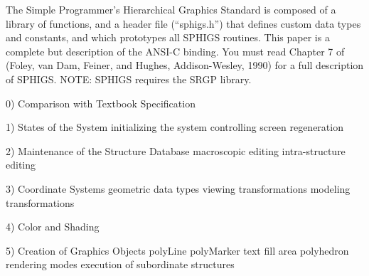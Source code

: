\def\minorsect#1#2{\section{\ttit{#1~~~~}#2}}
\def\majorsect#1#2{\section{\ttit{#1~~~~}#2}}
\def\elementgenerator{~~$\ddagger$}
\newpar
The Simple Programmer's Hierarchical Graphics 
Standard is composed of a library
of functions, and a
header file (``sphigs.h'') that defines custom data types and constants, and
which prototypes all SPHIGS routines.  This paper is a complete but
 description 
of the ANSI-C binding.  You must read Chapter 7 of
 (Foley, van Dam, Feiner,
and Hughes, Addison-Wesley, 1990) for a full description of SPHIGS.
NOTE: SPHIGS requires the SRGP library.


\bigskip

\item{0)} Comparison with Textbook Specification

\newdisplay

\item{1)} States of the System
 initializing the system
 controlling screen regeneration

\newdisplay

\item{2)} Maintenance of the Structure Database
 macroscopic editing
 intra-structure editing

\newdisplay

\item{3)} Coordinate Systems
 geometric data types
 viewing transformations
 modeling transformations

\newdisplay

\item{4)} Color and Shading

\newdisplay

\item{5)} Creation of Graphics Objects
 polyLine
 polyMarker
 text
 fill area
 polyhedron
 rendering modes
 execution of subordinate structures


